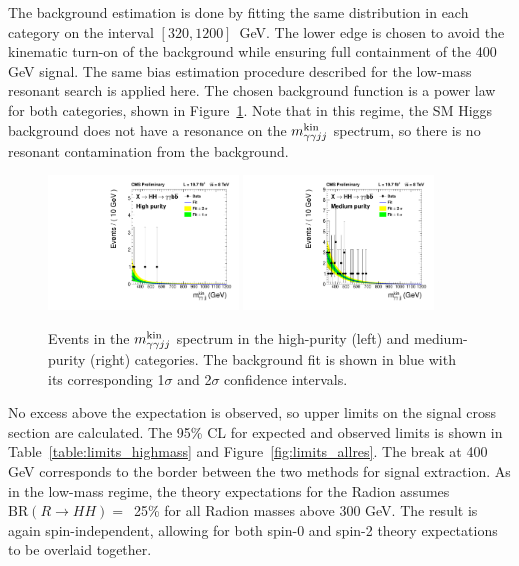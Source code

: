 The background estimation is done by fitting the same distribution in each category on the interval
$[320, 1200]$~GeV. The lower edge is chosen to avoid the kinematic turn-on of the background
while ensuring full containment of the 400 GeV signal. The same bias estimation procedure
described for the low-mass resonant search is applied here. The chosen background function is a power
law for both categories, shown in Figure~\ref{fig:datafit_4body}. Note that in this regime,
the SM Higgs background does not have a resonance on the $m_{\gamma\gamma jj}^{\rm kin}$ spectrum, so
there is no resonant contamination from the background.

\begin{figure}[ht!]
 \begin{center}
   \includegraphics[width=0.45\textwidth]{figures/results/databkgoversig_cat0_4body.pdf}
   \includegraphics[width=0.45\textwidth]{figures/results/databkgoversig_cat1_4body.pdf}
 \end{center}
\caption{Events in the $m_{\gamma\gamma jj}^{\rm kin}$ spectrum in the high-purity (left) and medium-purity (right)
categories. The background fit is shown in blue
with its corresponding 1$\sigma$ and 2$\sigma$ confidence intervals.}
\label{fig:datafit_4body}
\end{figure}

No excess above the expectation is observed, so upper limits on the signal cross section are calculated.
The 95\% CL for expected and observed limits is
shown in Table~\ref{table:limits_highmass} and Figure~\ref{fig:limits_allres}.
The break at 400 GeV corresponds
to the border between the two methods for signal extraction.
As in the low-mass regime, the theory expectations for the Radion assumes
$\text{BR}(R\rightarrow HH) =$~25\% for all Radion masses above 300 GeV. The result is again
spin-independent, allowing for both spin-0 and spin-2 theory expectations to be overlaid together.

